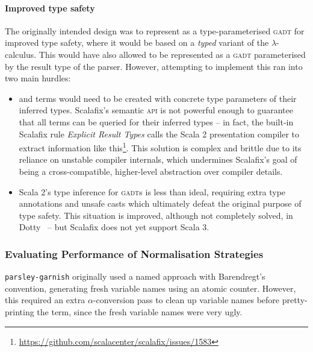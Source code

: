 \documentclass[../../../main.tex]{subfiles}
\begin{document}
\paragraph{Improved type safety}
The originally intended design was to represent  as a type-parameterised \textsc{gadt} for improved type safety, where it would be based on a \emph{typed} variant of the $\lambda$-calculus.
This would have also allowed  to be represented as a \textsc{gadt} parameterised by the result type of the parser.
However, attempting to implement this ran into two main hurdles:
\begin{itemize}
  \item {} and  terms would need to be created with concrete type parameters of their inferred types. Scalafix's semantic \textsc{api} is not powerful enough to guarantee that all terms can be queried for their inferred types -- in fact, the built-in Scalafix rule \emph{Explicit Result Types} calls the Scala 2 presentation compiler to extract information like this\footnote{\url{https://github.com/scalacenter/scalafix/issues/1583}}. This solution is complex and brittle due to its reliance on unstable compiler internals, which undermines Scalafix's goal of being a cross-compatible, higher-level abstraction over compiler details.
  \item Scala 2's type inference for \textsc{gadt}s is less than ideal, requiring extra type annotations and unsafe casts which ultimately defeat the original purpose of type safety. This situation is improved, although not completely solved, in Dotty~\cite{parreaux_towards_2019} -- but Scalafix does not yet support Scala 3.
\end{itemize}

\subsubsection{Evaluating Performance of Normalisation Strategies}
\texttt{parsley-garnish} originally used a named approach with Barendregt's convention, generating fresh variable names using an atomic counter.
However, this required an extra $\alpha$-conversion pass to clean up variable names before pretty-printing the term, since the fresh variable names were very ugly.
\end{document}
